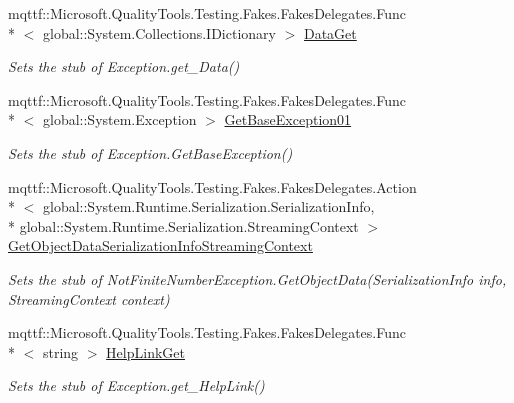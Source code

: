 \begin{DoxyCompactItemize}
\item 
mqttf\-::\-Microsoft.\-Quality\-Tools.\-Testing.\-Fakes.\-Fakes\-Delegates.\-Func\\*
$<$ global\-::\-System.\-Collections.\-I\-Dictionary $>$ \hyperlink{class_system_1_1_fakes_1_1_stub_not_finite_number_exception_a575e74c70db3997c53ef1307eba807fb}{Data\-Get}
\begin{DoxyCompactList}\small\item\em Sets the stub of Exception.\-get\-\_\-\-Data()\end{DoxyCompactList}\item 
mqttf\-::\-Microsoft.\-Quality\-Tools.\-Testing.\-Fakes.\-Fakes\-Delegates.\-Func\\*
$<$ global\-::\-System.\-Exception $>$ \hyperlink{class_system_1_1_fakes_1_1_stub_not_finite_number_exception_abb630995600f53fa7b7aed9232633145}{Get\-Base\-Exception01}
\begin{DoxyCompactList}\small\item\em Sets the stub of Exception.\-Get\-Base\-Exception()\end{DoxyCompactList}\item 
mqttf\-::\-Microsoft.\-Quality\-Tools.\-Testing.\-Fakes.\-Fakes\-Delegates.\-Action\\*
$<$ global\-::\-System.\-Runtime.\-Serialization.\-Serialization\-Info, \\*
global\-::\-System.\-Runtime.\-Serialization.\-Streaming\-Context $>$ \hyperlink{class_system_1_1_fakes_1_1_stub_not_finite_number_exception_abc75c7dda25a2e54ae3a1fad5e79894e}{Get\-Object\-Data\-Serialization\-Info\-Streaming\-Context}
\begin{DoxyCompactList}\small\item\em Sets the stub of Not\-Finite\-Number\-Exception.\-Get\-Object\-Data(\-Serialization\-Info info, Streaming\-Context context)\end{DoxyCompactList}\item 
mqttf\-::\-Microsoft.\-Quality\-Tools.\-Testing.\-Fakes.\-Fakes\-Delegates.\-Func\\*
$<$ string $>$ \hyperlink{class_system_1_1_fakes_1_1_stub_not_finite_number_exception_a116793a5984dafd308015ebd946c756d}{Help\-Link\-Get}
\begin{DoxyCompactList}\small\item\em Sets the stub of Exception.\-get\-\_\-\-Help\-Link()\end{DoxyCompactList}\item 

\end{DoxyCompactItemize}
